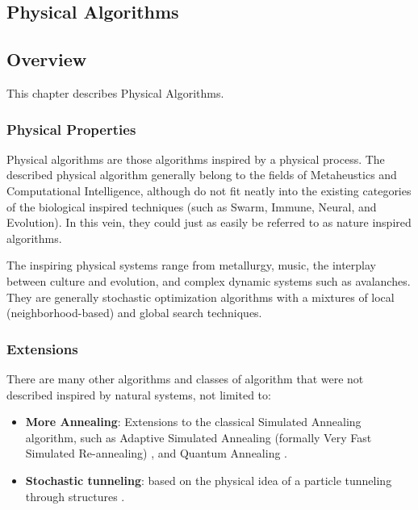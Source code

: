 

\renewcommand{\bibsection}{\subsection{\bibname}}
\begin{bibunit}

\chapter{Physical Algorithms}
\label{ch:physical}

\section{Overview}
This chapter describes Physical Algorithms.


\subsection{Physical Properties}
Physical algorithms are those algorithms inspired by a physical process. The described physical algorithm generally belong to the fields of Metaheustics and Computational Intelligence, although do not fit neatly into the existing categories of the biological inspired techniques (such as Swarm, Immune, Neural, and Evolution). In this vein, they could just as easily be referred to as nature inspired algorithms.

The inspiring physical systems range from metallurgy, music, the interplay between culture and evolution, and complex dynamic systems such as avalanches. They are generally stochastic optimization algorithms with a mixtures of local (neighborhood-based) and global search techniques.

%
%
\subsection{Extensions}
There are many other algorithms and classes of algorithm that were not described inspired by natural systems, not limited to:

\begin{itemize}
	\item \textbf{More Annealing}: Extensions to the classical Simulated Annealing algorithm, such as Adaptive Simulated Annealing (formally Very Fast Simulated Re-annealing) \cite{Ingber1989, Ingber1996}, and Quantum Annealing \cite{Apolloni1989, Das2005}.
	\item \textbf{Stochastic tunneling}: based on the physical idea of a particle tunneling through structures \cite{Wenzel1999}.
\end{itemize}

\putbib
\end{bibunit}

